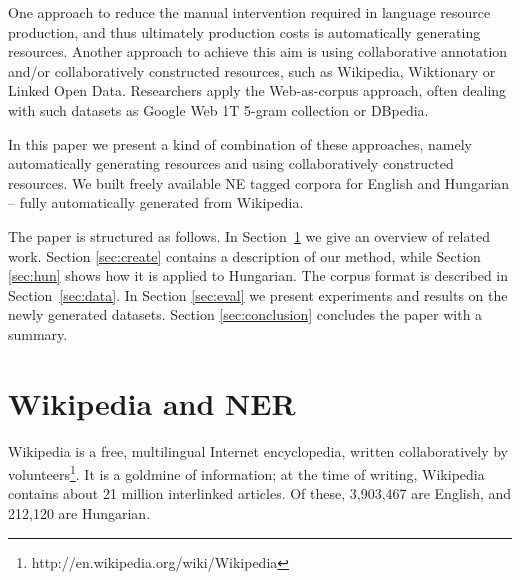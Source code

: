 \documentclass[11pt]{article}
\begin{document}
One approach to reduce the manual intervention required in language resource production, and thus ultimately production costs is automatically generating resources. Another approach to achieve this aim is using collaborative annotation and/or collaboratively constructed resources, such as Wikipedia, Wiktionary or Linked Open Data. Researchers apply the Web-as-corpus approach, often dealing with such datasets as Google Web 1T 5-gram collection or DBpedia.  


In this paper we present a kind of combination of these approaches, namely automatically generating resources and using collaboratively constructed resources. We built freely available NE tagged corpora for English and Hungarian -- fully automatically generated from Wikipedia. %

The paper is structured as follows. In Section~\ref{sec:related} we give an overview of related work. Section \ref{sec:create} contains a description of our method, while Section \ref{sec:hun} shows how it is applied to Hungarian. The corpus format is described in Section~\ref{sec:data}. In Section \ref{sec:eval} we present experiments and results on the newly generated datasets. Section \ref{sec:conclusion} concludes the paper with a summary. 


\section{Wikipedia and NER}
\label{sec:related}

Wikipedia is a free, multilingual Internet encyclopedia, written collaboratively by volunteers\footnote{http://en.wikipedia.org/wiki/Wikipedia}. It is a goldmine of information; at the time of writing, Wikipedia contains about 21 million interlinked articles. Of these, 3,903,467 are English, and 212,120 are Hungarian. 
\end{document}
